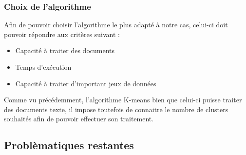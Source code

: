 \documentclass[memoire.tex]{subfiles}
\begin{document}
\subsubsection{Choix de l'algorithme}
Afin de pouvoir choisir l'algorithme le plus adapté à notre cas, celui-ci doit pouvoir répondre aux critères suivant : \begin{itemize}
\item Capacité à traiter des documents
\item Temps d'exécution
\item Capacité à traiter d'important jeux de données
\end{itemize}
Comme vu précédemment, l'algorithme K-means bien que celui-ci puisse traiter des documents texte, il impose toutefois de connaitre le nombre de clusters souhaités afin de pouvoir effectuer son traitement. 
\subsection{Problèmatiques restantes}
\end{document}
